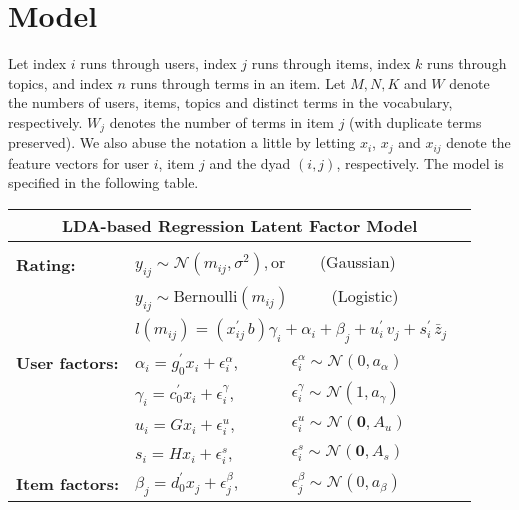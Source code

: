 \section{Model}

Let index $i$ runs through
users, index $j$ runs through items, index $k$ runs through topics,
and index $n$ runs through terms in an item. Let $M, N, K$ and $W$ denote
the numbers of users, items, topics and distinct terms in the
vocabulary, respectively. $W_j$ denotes the number of terms in item
$j$ (with duplicate terms preserved). We also abuse the notation a
little by letting $x_i$, $x_j$ and $x_{ij}$ denote the feature vectors
for user $i$, item $j$ and the dyad $(i,j)$, respectively.
The model is specified in the following table.\\

\noindent
\begin{tabular}{lllr}
\hline 
	\multicolumn{4}{c}{{\bf LDA-based Regression Latent Factor Model}} \\
\hline 
	\multicolumn{4}{c}{\vspace{-0.1in}} \\
{\bf Rating:} &
	\multicolumn{2}{l}{$y_{ij} \sim \mathcal{N}(m_{ij}, \sigma^2), \textrm{or}$
	~~~ (Gaussian)} & \\
 	&
	\multicolumn{2}{l}{$y_{ij} \sim \textrm{Bernoulli}(m_{ij})$
	~~~~ (Logistic)} & \\
	\vspace{0.07in}
	& \multicolumn{2}{l}{
	$l(m_{ij}) = (x_{ij}^{\prime}\, b) \gamma_i  + \alpha_i + \beta_j + 
					 u_{i}^{\prime} \, v_{j} +
					 s_{i}^{\prime} \, \bar{z}_{j}$
	} &  \\ 
{\bf User factors:}
& 	$\alpha_i = g_{0}^{\prime}x_i + \epsilon_{i}^{\alpha}$,
		& $\epsilon_{i}^{\alpha} \sim \mathcal{N}(0,a_{\alpha})$ &  \\
& 	$\gamma_i = c_{0}^{\prime}x_i + \epsilon_{i}^{\gamma}$,
		& $\epsilon_{i}^{\gamma} \sim \mathcal{N}(1,a_{\gamma})$ &  \\
& 	$u_i = G x_i + \epsilon_{i}^{u}$,
		& $\epsilon_{i}^{u} \sim \mathcal{N}(\bm{0},A_u)$ & \\
& 	$s_i = H x_i + \epsilon_{i}^{s}$,
		& $\epsilon_{i}^{s} \sim \mathcal{N}(\bm{0},A_s)$ & \vspace{0.07in} \\
{\bf Item factors:}
& 	$\beta_j = d_{0}^{\prime}x_j + \epsilon_{j}^{\beta}$,
		& $\epsilon_{j}^{\beta} \sim \mathcal{N}(0,a_{\beta})$ & \\

\end{tabular}
